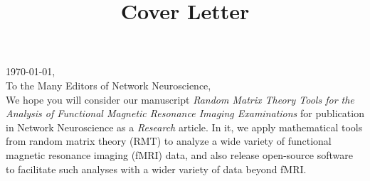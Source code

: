 \documentclass{article}
\begin{document}

\thispagestyle{nofooter}  %
\setlength{\headheight}{30.0pt}
\normalsize

\title{Cover Letter}





\noindent
\today, \\
To the Many Editors of Network Neuroscience, \\

We hope you will consider our manuscript \emph{Random Matrix Theory Tools for the Analysis of
Functional Magnetic Resonance Imaging Examinations} for publication in Network Neuroscience as a
\emph{Research} article. In it, we apply mathematical tools from random matrix theory (RMT) to
analyze a wide variety of functional magnetic resonance imaging (fMRI) data, and also release
open-source software to facilitate such analyses with a wider variety of data beyond fMRI.
\end{document}
